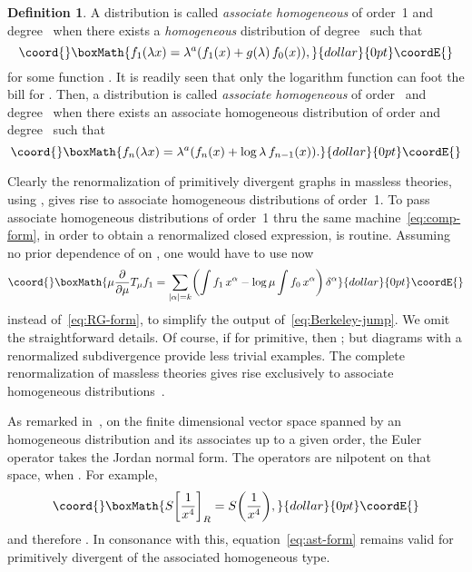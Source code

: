 \documentclass[a4paper,12pt]{article}
\renewcommand{\a}{\alpha}          %
\providecommand{\del}{\partial}        %
\providecommand{\dl}{\delta}           %
\providecommand{\la}{\lambda}          %
\providecommand{\7}{\dagger}           %
\theoremstyle{plain}
\theoremstyle{definition}
\newtheorem{defn}{Definition}       %
\begin{document}
\begin{defn}
A distribution \coordHE{} is called \textit{associate homogeneous} of
order~1 and degree~\coordHE{} when there exists a \textit{homogeneous}
distribution \coordHE{} of degree~\coordHE{} such that
$$\coord{}\boxMath{
f_1(\la x) = \la^a(f_1(x) + g(\la) \,f_0(x)),
}{dollar}{0pt}\coordE{}$$
for some function \myHighlight{$g(\la)$}\coordHE{}. It is readily seen that only the logarithm
function can foot the bill for \coordHE{}. Then, a distribution \coordHE{} is
called \textit{associate homogeneous} of order~\coordHE{} and degree~\coordHE{} when
there exists an associate homogeneous distribution \coordHE{} of order
\coordHE{} and degree~\coordHE{} such that
$$\coord{}\boxMath{
f_n(\la x) = \la^a(f_n(x) + \log\la \,f_{n-1}(x)).
}{dollar}{0pt}\coordE{}$$
\end{defn}

Clearly the renormalization of primitively divergent graphs in
massless theories, using \coordHE{}, gives rise to associate homogeneous
distributions of order~1. To pass associate homogeneous distributions
of order~1 thru the same machine~\eqref{eq:comp-form}, in order to
obtain a renormalized closed expression, is routine. Assuming no prior
dependence of \coordHE{} on \myHighlight{$\mu$}\coordHE{}, one would have to use now
$$\coord{}\boxMath{
\mu\frac{\del}{\del\mu} T_\mu f_1 = \sum_{|\a|=k}
\biggl( \int f_1\,x^\a  - \log\mu \int f_0\,x^\a \biggr)\,\dl^\a
}{dollar}{0pt}\coordE{}$$
instead of~\eqref{eq:RG-form}, to simplify the output
of~\eqref{eq:Berkeley-jump}. We omit the straightforward details. Of
course, if \coordHE{} for \coordHE{} primitive, then \coordHE{};
but diagrams with a renormalized subdivergence provide less trivial
examples. The complete renormalization of massless theories gives rise
exclusively to associate homogeneous distributions~\cite{Flora}.

As remarked in~\cite{ClassicalRussian}, on the finite dimensional
vector space spanned by an homogeneous distribution and its associates
up to a given order, the Euler operator takes the Jordan normal form.
The \coordHE{} operators are nilpotent on that space, when \coordHE{}.
For example,
$$\coord{}\boxMath{
S\biggl[\frac{1}{x^4}\biggr]_R  = S\biggl(\frac{1}{x^4}\biggr),
}{dollar}{0pt}\coordE{}$$
and therefore \coordHE{}. In consonance with
this, equation~\eqref{eq:ast-form} remains valid for \coordHE{} primitively
divergent of the associated homogeneous type.
\end{document}
